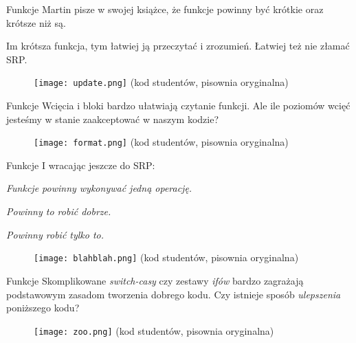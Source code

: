 \begin{frame}{Funkcje}
	Martin pisze w swojej książce, że funkcje powinny być krótkie oraz krótsze niż są.
	
	Im krótsza funkcja, tym łatwiej ją przeczytać i zrozumień. Łatwiej też nie złamać SRP.
\end{frame}

\begin{frame}
	\begin{figure} \centering
		\texttt{[image: update.png]}
		\footnotesize{(kod studentów, pisownia oryginalna)}
	\end{figure}
\end{frame}

\begin{frame}{Funkcje}
	Wcięcia i bloki bardzo ułatwiają czytanie funkcji. Ale ile poziomów wcięć jesteśmy w stanie zaakceptować w naszym kodzie?
\end{frame}

\begin{frame}
	\begin{figure} \centering
		\texttt{[image: format.png]}
		\footnotesize{(kod studentów, pisownia oryginalna)}
	\end{figure}
\end{frame}

\begin{frame}{Funkcje}
	I wracając jeszcze do SRP:
	
	\emph{Funkcje powinny wykonywać jedną operację.}
	
	\emph{Powinny to robić dobrze.}
	
	\emph{Powinny robić tylko to.}
\end{frame}

\begin{frame}
	\begin{figure} \centering
		\texttt{[image: blahblah.png]}
		\footnotesize{(kod studentów, pisownia oryginalna)}
	\end{figure}
\end{frame}

\begin{frame}{Funkcje}
	Skomplikowane \emph{switch-casy} czy zestawy \emph{ifów} bardzo zagrażają podstawowym zasadom tworzenia dobrego kodu. Czy istnieje sposób \emph{ulepszenia} poniższego kodu?
\end{frame}

\begin{frame}
	\begin{figure} \centering
		\texttt{[image: zoo.png]}
		\footnotesize{(kod studentów, pisownia oryginalna)}
	\end{figure}
\end{frame}


